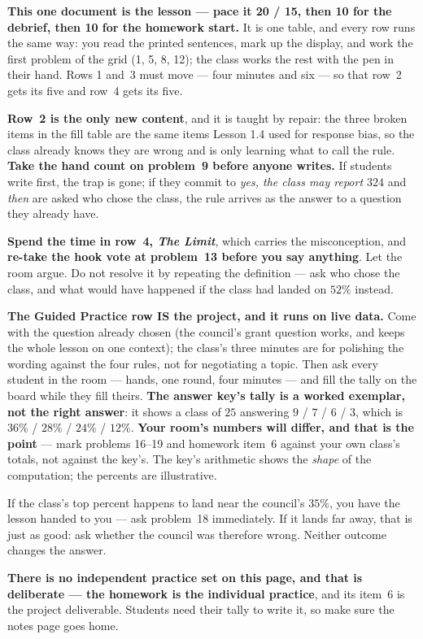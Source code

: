 \documentclass[10pt]{article}
\begin{document}
\begin{teachernote}
\textbf{This one document is the lesson --- pace it 20 / 15, then 10 for the debrief, then 10 for
the homework start.} It is one table, and every row runs the same way: you read the printed
sentences, mark up the display, and work the first problem of the grid (1, 5, 8, 12); the class
works the rest with the pen in their hand. Rows 1 and~3 must move --- four minutes and six --- so
that row~2 gets its five and row~4 gets its five.

\textbf{Row~2 is the only new content}, and it is taught by repair: the three broken items in the
fill table are the same items Lesson 1.4 used for response bias, so the class already knows they
are wrong and is only learning what to call the rule. \textbf{Take the hand count on problem~9
before anyone writes.} If students write first, the trap is gone; if they commit to \emph{yes, the
class may report $324$} and \emph{then} are asked who chose the class, the rule arrives as the
answer to a question they already have.

\textbf{Spend the time in row~4, \emph{The Limit}}, which carries the misconception, and
\textbf{re-take the hook vote at problem~13 before you say anything}. Let the room argue. Do not
resolve it by repeating the definition --- ask who chose the class, and what would have happened
if the class had landed on $52\%$ instead.

\textbf{The Guided Practice row IS the project, and it runs on live data.} Come with the question
already chosen (the council's grant question works, and keeps the whole lesson on one context);
the class's three minutes are for polishing the wording against the four rules, not for
negotiating a topic. Then ask every student in the room --- hands, one round, four minutes --- and
fill the tally on the board while they fill theirs. \textbf{The answer key's tally is a worked
exemplar, not the right answer}: it shows a class of $25$ answering $9$ / $7$ / $6$ / $3$, which
is $36\%$ / $28\%$ / $24\%$ / $12\%$. \textbf{Your room's numbers will differ, and that is the
point} --- mark problems 16--19 and homework item~6 against your own class's totals, not against
the key's. The key's arithmetic shows the \emph{shape} of the computation; the percents are
illustrative.

If the class's top percent happens to land near the council's $35\%$, you have the lesson handed
to you --- ask problem~18 immediately. If it lands far away, that is just as good: ask whether the
council was therefore wrong. Neither outcome changes the answer.

\textbf{There is no independent practice set on this page, and that is deliberate --- the homework
is the individual practice}, and its item~6 is the project deliverable. Students need their tally
to write it, so make sure the notes page goes home.
\end{teachernote}
\end{document}
